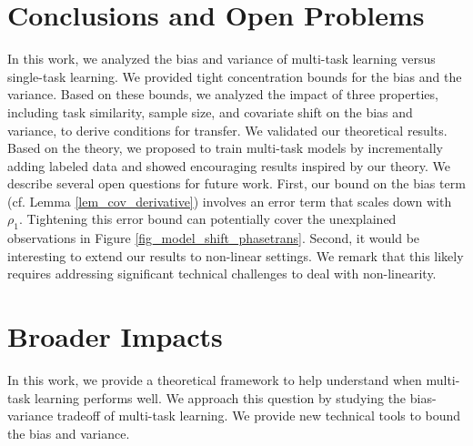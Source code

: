 \vspace{-0.05in}
\section{Conclusions and Open Problems}
\vspace{-0.05in}

In this work, we analyzed the bias and variance of multi-task learning versus single-task learning.
We provided tight concentration bounds for the bias and the variance.
Based on these bounds, we analyzed the impact of three properties, including task similarity, sample size, and covariate shift on the bias and variance, to derive conditions for transfer.
We validated our theoretical results.
Based on the theory, we proposed to train multi-task models by incrementally adding labeled data and showed encouraging results inspired by our theory.
We describe several open questions for future work.
First, our bound on the bias term (cf. Lemma \ref{lem_cov_derivative}) involves an error term that scales down with $\rho_1$.
Tightening this error bound can potentially cover the unexplained observations in Figure \ref{fig_model_shift_phasetrans}.
Second, it would be interesting to extend our results to non-linear settings.
We remark that this likely requires addressing significant technical challenges  to deal with non-linearity.

\newpage
\section*{Broader Impacts}

In this work, we provide a theoretical framework to help understand when multi-task learning performs well.
We approach this question by studying the bias-variance tradeoff of multi-task learning.
We provide new technical tools to bound the bias and variance.

